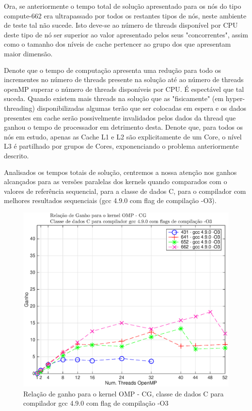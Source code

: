 \documentclass[conference,compsoc]{IEEEtran}
\begin{document}
Ora, se anteriormente o tempo total de solução apresentado para os nós do tipo compute-662 era ultrapassado por todos os restantes tipos de nós, neste ambiente de teste tal não sucede. Isto deve-se ao número de threads disponível por CPU deste tipo de nó ser superior ao valor apresentado pelos seus "concorrentes", assim como o tamanho dos níveis de cache pertencer ao grupo dos que apresentam maior dimensão. \par 
Denote que o tempo de computação apresenta uma redução para todo os incrementes no número de threads presente na solução até ao número de threads openMP superar o número de threads disponíveis por CPU. É espectável que tal suceda. Quando existem mais threads na solução que as "fisicamente" (em hyper-threading) disponibilizadas algumas terão que ser colocadas em espera e os dados presentes em cache serão possivelmente invalidados pelos dados da thread que ganhou o tempo de processador em detrimento desta. Denote que, para todos os nós em estudo, apenas as Cache L1 e L2 são explicitamente de um Core, o nível L3 é partilhado por grupos de Cores, exponenciando o problema anteriormente descrito. \par 

Analisados os tempos totais de solução, centremos a nossa atenção nos ganhos alcançados para as versões paralelas dos kernels quando comparados com o valores de referência sequencial, para a classe de dados C, para o compilador com melhores resultados sequenciais (gcc 4.9.0 com flag de compilação -O3).\par 



\begin{figure}[H]
\centering
\includegraphics[width=1.1\columnwidth]{EPS/OMP/ganho_cg_03.eps}
\caption{Relação de ganho para o kernel OMP - CG, classe de dados C para  compilador gcc 4.9.0 com flag de compilação -O3}
\label{ganho_omp_cg_c}
\end{figure}
\end{document}

